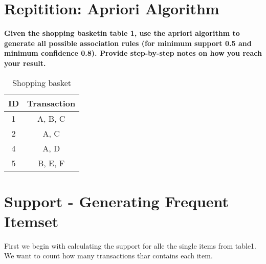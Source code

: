 \section{Repitition: Apriori Algorithm}

	{\bf Given the shopping basketin table 1, use the apriori algorithm to generate
	all possible association rules (for minimum support 0.5 and minimum confidence 0.8).
	Provide step-by-step notes on how you reach your result.}

	\begin{table}[H]
		\centering
		\begin{tabular}{ c | c }
			\hline
			{\bf ID} & {\bf Transaction} \\ \hline
			1 & A, B, C \\
			2 & A, C \\
			4 & A, D \\
			5 & B, E, F \\ \hline
		\end{tabular}
		\caption{Shopping basket}
	\end{table}
	
	\noindent\makebox[\linewidth]{\rule{\textwidth}{1pt}} 


	\section*{Support - Generating Frequent Itemset}

	First we begin with calculating the support for alle the single items from
	table1. We want to count how many transactions thar contains each item. 
	
